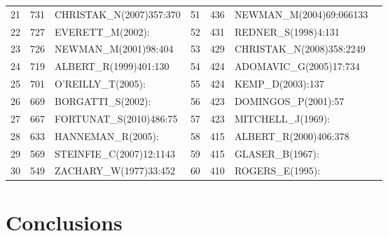 \documentclass[11pt]{article} %
\begin{document}
\begin{table}
\begin{tabular}{c|c|l||c|c|l|l}
21&   	731&   	CHRISTAK\_N(2007)357:370&   	51&   	436&   	NEWMAN\_M(2004)69:066133\\
22&   	727&   	EVERETT\_M(2002):&   	52&   	431&   	REDNER\_S(1998)4:131\\
23&   	726&   	NEWMAN\_M(2001)98:404&   	53&   	429&   	CHRISTAK\_N(2008)358:2249\\
24&   	719&   	ALBERT\_R(1999)401:130&   	54&   	424&   	ADOMAVIC\_G(2005)17:734\\
25&   	701&   	O'REILLY\_T(2005):&   	55&   	424&   	KEMP\_D(2003):137\\
26&   	669&   	BORGATTI\_S(2002):&   	56&   	423&   	DOMINGOS\_P(2001):57\\
27&   	667&   	FORTUNAT\_S(2010)486:75&   	57&   	423&   	MITCHELL\_J(1969):\\
28&   	633&   	HANNEMAN\_R(2005):&   	58&   	415&   	ALBERT\_R(2000)406:378\\
29&   	569&   	STEINFIE\_C(2007)12:1143&   	59&   	415&   	GLASER\_B(1967):\\
30&   	549&   	ZACHARY\_W(1977)33:452&   	60&   	410&   	ROGERS\_E(1995):\\ \hline
\end{tabular}
\end{table}


\section{Conclusions}




\end{document}
